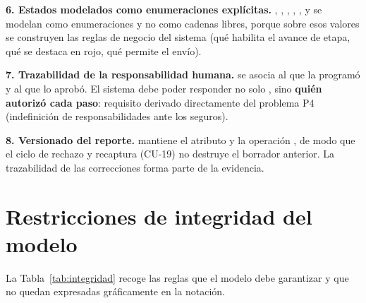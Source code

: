 \noindent \textbf{6. Estados modelados como enumeraciones explícitas.} ,
, , , ,
 y  se modelan como enumeraciones y no como cadenas libres,
porque sobre esos valores se construyen las reglas de negocio del sistema (qué habilita el avance
de etapa, qué se destaca en rojo, qué permite el envío).

\noindent \textbf{7. Trazabilidad de la responsabilidad humana.}  se asocia al 
que la programó y  al  que lo aprobó. El sistema debe poder responder
no solo , sino \textbf{quién autorizó cada paso}: requisito derivado directamente
del problema P4 (indefinición de responsabilidades ante los seguros).

\noindent \textbf{8. Versionado del reporte.}  mantiene el atributo  y la
operación , de modo que el ciclo de rechazo y recaptura (CU-19) no destruye el
borrador anterior. La trazabilidad de las correcciones forma parte de la evidencia.

\section{Restricciones de integridad del modelo}
\label{sec:integridad}

La Tabla~\ref{tab:integridad} recoge las reglas que el modelo debe garantizar y que no quedan
expresadas gráficamente en la notación.

